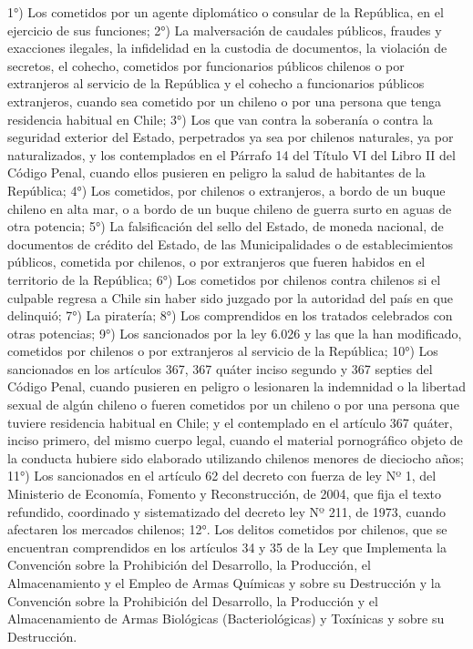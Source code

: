     1°) Los cometidos por un agente diplomático o consular de la República, en el ejercicio de sus funciones;
    2°) La malversación de caudales públicos, fraudes y exacciones ilegales, la infidelidad en la custodia de documentos, la violación de secretos, el cohecho, cometidos por funcionarios públicos chilenos o por extranjeros al servicio de la República y el cohecho a funcionarios públicos extranjeros, cuando sea cometido por un chileno o por una persona que tenga residencia habitual en Chile;
    3°) Los que van contra la soberanía o contra la seguridad exterior del Estado, perpetrados ya sea por chilenos naturales, ya por naturalizados, y los contemplados en el Párrafo 14 del Título VI del Libro II del Código Penal, cuando ellos pusieren en peligro la salud de habitantes de la República;
    4°) Los cometidos, por chilenos o extranjeros, a bordo de un buque chileno en alta mar, o a bordo de un buque chileno de guerra surto en aguas de otra potencia;
    5°) La falsificación del sello del Estado, de moneda nacional, de documentos de crédito del Estado, de las Municipalidades o de establecimientos públicos, cometida por chilenos, o por extranjeros que fueren habidos en el territorio de la República;
    6°) Los cometidos por chilenos contra chilenos si el culpable regresa a Chile sin haber sido juzgado por la autoridad del país en que delinquió;
    7°) La piratería;
    8°) Los comprendidos en los tratados celebrados con otras potencias;
    9°) Los sancionados por la ley 6.026 y las que la han modificado, cometidos por chilenos o por extranjeros al servicio de la República;
    10°) Los sancionados en los artículos 367, 367 quáter inciso segundo y 367 septies del Código Penal, cuando pusieren en peligro o lesionaren la indemnidad o la libertad sexual de algún chileno o fueren cometidos por un chileno o por una persona que tuviere residencia habitual en Chile; y el contemplado en el artículo 367 quáter, inciso primero, del mismo cuerpo legal, cuando el material pornográfico objeto de la conducta hubiere sido elaborado utilizando chilenos menores de dieciocho años;
    11°) Los sancionados en el artículo 62 del decreto con fuerza de ley Nº 1, del Ministerio de Economía, Fomento y Reconstrucción, de 2004, que fija el texto refundido, coordinado y sistematizado del decreto ley Nº 211, de 1973, cuando afectaren los mercados chilenos;
    12°. Los delitos cometidos por chilenos, que se encuentran comprendidos en los artículos 34 y 35 de la Ley que Implementa la Convención sobre la Prohibición del Desarrollo, la Producción, el Almacenamiento y el Empleo de Armas Químicas y sobre su Destrucción y la Convención sobre la Prohibición del Desarrollo, la Producción y el Almacenamiento de Armas Biológicas (Bacteriológicas) y Toxínicas y sobre su Destrucción.




